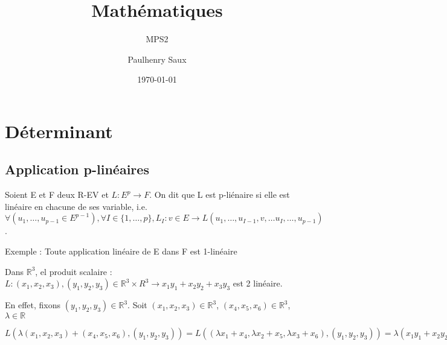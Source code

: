 \documentclass[french]{yLectureNote}
\title{Mathématiques}
\subtitle{MPS2}
\author{Paulhenry Saux}
\date{\today}
\newcommand{\R}[0]{\mathbb{R}}
\begin{document}
\setcounter{chapter}{7}
\chapter{Déterminant}
\section{Application p-linéaires}
\begin{definition}
Soient E et F deux R-EV et \(L:E^p\to F\). On dit que L est p-liénaire si elle est linéaire en chacune de ses variable, i.e. \(\forall (u_1,\dots, u_{p-1}\in E^{p-1}), \forall I\in \{1,\dots, p\}, L_I : v\in E \to L(u_1,\dots, u_{I-1},v,\dots u_I,\dots, u_{p-1})\).
\end{definition}
Exemple : Toute application linéaire de E dans F est 1-linéaire

Dans \(\R^3\), el produit scalaire : \(L : (x_1,x_2,x_3),(y_1,y_2,y_3)\in \R^3\times R^3 \to x_1y_1+x_2y_2+x_3y_3\) est 2 linéaire.

En effet, fixons \((y_1,y_2,y_3)\in \R^3\). Soit \((x_1,x_2,x_3)\in \R^3\), \((x_4,x_5,x_6)\in \R^3\), \(\lambda\in \R\)

\(L(\lambda(x_1,x_2,x_3) + (x_4,x_5,x_6), (y_1,y_2,y_3)) = L((\lambda x_1+x_4, \lambda x_2+x_5, \lambda x_3+x_6), (y_1,y_2,y_3)) = \lambda (x_1y_1+x_2y_2+x_3y_3)+(x_4y_1+x_5y_2+x_6y_3) = \lambda L() + L()\)
\end{document}
